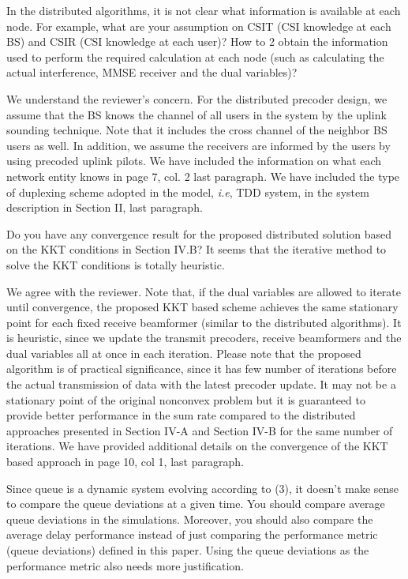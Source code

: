 \begin{itemize}
 In the distributed algorithms, it is not clear what information is available at each node. For example, what are your assumption on CSIT (CSI knowledge at each BS) and CSIR (CSI knowledge at each user)? How to 2 obtain the information used to perform the required calculation at each node (such as calculating the actual interference, MMSE receiver and the dual variables)?

\resp We understand the reviewer's concern. For the distributed precoder design, we assume that the \ac{BS}  knows the channel  of all users in the system by the uplink sounding technique. Note that it includes the cross channel of the neighbor BS users as well. In addition, we assume the receivers are informed by the users by using precoded uplink pilots. We have included the information on what each network entity knows in page 7, col. 2 last paragraph. We have included the type of duplexing scheme adopted in the model, \textit{i.e}, TDD system, in the system description in Section II, last paragraph.

 Do you have any convergence result for the proposed distributed solution based on the KKT conditions in Section IV.B? It seems that the iterative method to solve the KKT conditions is totally heuristic.

\resp We agree with the reviewer. Note that, if the dual variables are allowed to iterate until convergence, the proposed KKT based scheme achieves the same stationary point for each fixed receive beamformer (similar to the distributed algorithms). It is heuristic, since we update the transmit precoders, receive beamformers and the dual variables all at once in each iteration. Please note that the proposed algorithm is of practical significance, since it has few number of iterations before the actual transmission of data with the latest precoder update. It may not be a stationary point of the original nonconvex problem but it is guaranteed to provide better performance in the sum rate compared to the distributed approaches presented in Section IV-A and Section IV-B for the same number of iterations. We have provided additional details on the convergence of the KKT based approach in page 10, col 1, last paragraph.

 Since queue is a dynamic system evolving according to (3), it doesn’t make sense to compare the queue deviations at a given time. You should compare average queue deviations in the simulations. Moreover, you should also compare the average delay performance instead of just comparing the performance metric (queue deviations) defined in this paper. Using the queue deviations as the performance metric also needs more justification.


\end{itemize}

